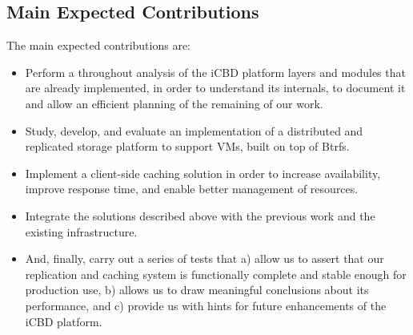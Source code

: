 


\subsection{Main Expected Contributions} %
\label{sub:intro_main_expected_contributions}

The main expected contributions are: 

\begin{itemize}
  \item Perform a throughout analysis of the iCBD platform layers and modules that are already implemented, in order to understand its internals, to document it and allow an efficient planning of the remaining of our work. 
  \item Study, develop, and evaluate an implementation of a distributed and replicated storage platform to support VMs, built on top of Btrfs.
  \item Implement a client-side caching solution in order to increase availability, improve response time, and enable better management of resources.
  \item Integrate the solutions described above with the previous work and the existing infrastructure.
  \item And, finally, carry out a series of tests that a) allow us to assert that our replication and caching system is functionally complete and stable enough for production use, b) allows us to draw meaningful conclusions about its performance, and c) provide us with hints for future enhancements of the iCBD platform.
\end{itemize}




